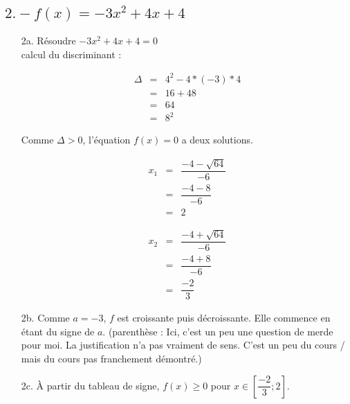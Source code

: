 \documentclass[11pt]{article}
\begin{document}
\newpage

\subsection{$2. - f(x) = -3x^2 + 4x + 4$}

\begin{enumerate}

\item[2a.] Résoudre $-3x^2 + 4x + 4 = 0$\\
  calcul du discriminant :

  \begin{eqnarray*}
    \Delta &=& 4^2 - 4*(-3)*4\\
    &=& 16 + 48\\
    &=& 64 \\
    &=& 8^2
  \end{eqnarray*}


  Comme $\Delta > 0$, l'équation $f(x) =0 $ a deux solutions.

  \begin{multicols}{2}
    \begin{eqnarray*}
      x_1 &=& \dfrac{-4 - \sqrt{64}}{-6} \\
      &=& \dfrac{-4 - 8}{-6} \\
      &=& 2
    \end{eqnarray*}

    \begin{eqnarray*}
      x_2 &=& \dfrac{-4 + \sqrt{64}}{-6} \\
      &=& \dfrac{-4 + 8}{-6} \\
      &=& \dfrac{-2}{3}
    \end{eqnarray*}
  \end{multicols}

\item[2b.] Comme $a=-3$, $f$ est croissante puis décroissante. Elle commence en étant du signe de $a$.
  (parenthèse : Ici, c'est un peu une question de merde pour moi. La justification n'a pas vraiment de sens. C'est un peu du cours / mais du cours pas franchement démontré.)


\item[2c.] À partir du tableau de signe, $f(x) \geq 0$ pour $x \in \left[ \dfrac{-2}{3} ; 2 \right]$.


\end{enumerate}
\end{document}

